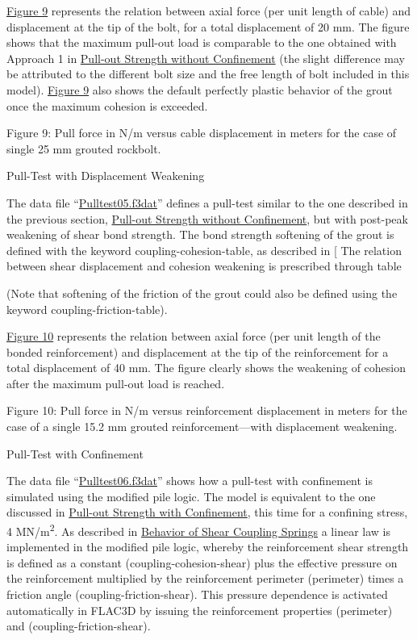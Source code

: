 \documentclass[a4paper, nobind]{templates/ociamthesis}
\begin{document}
\protect\hyperlink{pulltest-pile1}{Figure 9} represents the relation between axial
force (per unit length of cable) and displacement at the tip of the
bolt, for a
total displacement of 20 mm. The figure shows that the maximum pull-out
load is
comparable to the one obtained with Approach 1 in \protect\hyperlink{pulltest-cable1-section}{Pull-out Strength
without
Confinement} (the slight difference may be
attributed to the different
bolt size and the free length of bolt included in this model). \protect\hyperlink{pulltest-pile1}{Figure
9} also shows the default perfectly plastic
behavior of the grout once the maximum cohesion is exceeded.

Figure 9: Pull force in N/m versus cable displacement in meters
for the case of single 25 mm grouted rockbolt.

Pull-Test with Displacement
Weakening

The data file ``\protect\hyperlink{pulltest05data}{Pulltest05.f3dat}'' defines a pull-test
similar to the one described in the previous section, \protect\hyperlink{pulltest-pile1-section}{Pull-out
Strength without Confinement}, but with
post-peak weakening of shear
bond strength. The bond strength softening of the grout is defined with
the
keyword coupling-cohesion-table, as described in {[}
The relation between shear displacement and cohesion
weakening is prescribed through table

(Note that softening
of the friction of the grout could also be defined using the keyword
coupling-friction-table).

\protect\hyperlink{pulltest-pile2}{Figure 10} represents the relation between axial
force (per unit length of the bonded reinforcement) and displacement at
the tip
of the reinforcement for a total displacement of 40 mm. The figure
clearly shows
the weakening of cohesion after the maximum pull-out load is reached.

Figure 10: Pull force in N/m versus reinforcement displacement
in meters for the case of a single 15.2 mm grouted reinforcement---with
displacement weakening.

Pull-Test with Confinement

The data file ``\protect\hyperlink{pulltest06data}{Pulltest06.f3dat}'' shows how a
pull-test
with confinement is simulated using the modified pile logic. The model
is
equivalent to the one discussed in \protect\hyperlink{pulltest-cable2-section}{Pull-out Strength with
Confinement}, this time for a confining
stress, 4 MN/m\textsuperscript{2}. As
described in \href{../../../../sel/doc/manual/sel_manual/piles/piles.html\#pile-shear-coupling-springs}{Behavior
of Shear Coupling
Springs}
a linear law is implemented in the modified
pile logic, whereby the reinforcement shear strength is defined as a
constant
(coupling-cohesion-shear) plus the effective pressure
on the reinforcement multiplied by the reinforcement perimeter
(perimeter) times a friction angle (coupling-friction-shear). This
pressure dependence is
activated automatically in FLAC3D by issuing the
reinforcement properties (perimeter) and (coupling-friction-shear).
\end{document}
